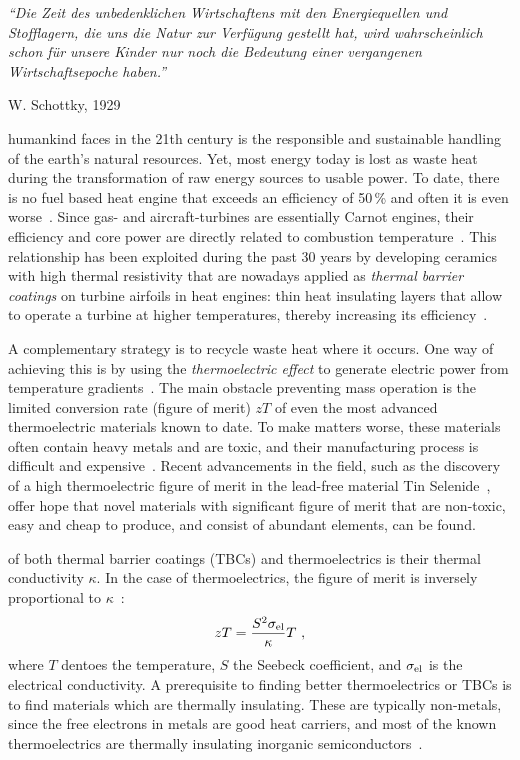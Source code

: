 \epigraph{\singlespacing \it ``Die Zeit des unbedenklichen Wirtschaftens mit den Energiequellen und Stofflagern, die uns die Natur zur Verfügung gestellt hat, wird wahrscheinlich schon für unsere Kinder nur noch die Bedeutung einer vergangenen Wirtschaftsepoche haben.''}{W. Schottky, 1929~\cite{Schottky1929}}
 humankind faces in the 21th century is the responsible and sustainable handling of the earth's natural resources.  Yet, most energy today is lost as waste heat during the transformation of raw energy sources to usable power. To date, there is no fuel based heat engine that exceeds an efficiency of 50\,\% and often it is even worse~\cite{eia}. 
Since gas- and aircraft-turbines are essentially Carnot engines, their efficiency and core power are directly related to combustion temperature~\cite{Clarke2012,Perepezko2009}. This relationship has been exploited during the past 30 years by developing 
ceramics with high thermal resistivity that are nowadays applied as \emph{thermal barrier coatings} on turbine airfoils in heat engines: thin heat insulating layers that allow to operate a turbine at higher temperatures, thereby increasing its efficiency~\cite{Clarke2003}.

A complementary strategy is to recycle waste heat where it occurs. One way of achieving this is by using the \emph{thermoelectric effect} to  generate electric power from temperature gradients~\cite{Snyder2008}. The main obstacle preventing mass operation is the limited conversion rate (figure of merit) $zT$ of even the most advanced thermoelectric materials known to date. To make matters worse, these materials often contain heavy metals and are toxic, 
and their manufacturing process is difficult and expensive~\cite{Nolas2001}. Recent advancements in the field, such as the discovery of a high thermoelectric figure of merit in the lead-free material Tin Selenide~\cite{zhao2014}, offer hope that novel materials with significant figure of merit that are non-toxic, easy and cheap to produce, and consist of abundant elements, can be found.

 of both thermal barrier coatings (TBCs) and thermoelectrics is their thermal conductivity $\kappa$. In the case of thermoelectrics, the figure of merit is inversely proportional to $\kappa$~\cite{Nolas2001}:
\begin{align}
zT = \frac{S^2 \sigma_{\rm el}}{\kappa} T~,
\label{eq:zT}
\end{align} 
where $T$ dentoes the temperature, $S$ the Seebeck coefficient, and $\sigma_{\rm el}$ is the electrical conductivity.
A prerequisite to finding better thermoelectrics or TBCs is to find materials which are thermally insulating. These are typically non-metals, since the free electrons in metals are good heat carriers, and most of the known thermoelectrics are thermally insulating inorganic semiconductors~\cite[p.\,15]{Nolas2001}.

